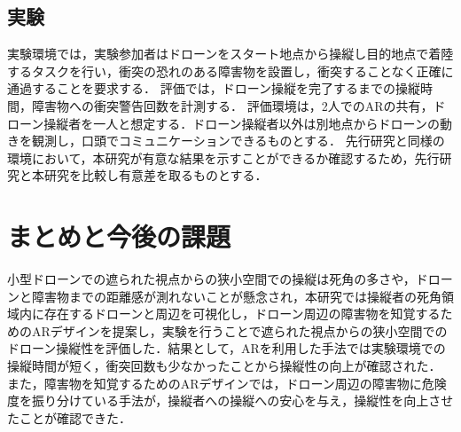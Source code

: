\documentclass[a4paper,10pt,twocolumn,uplatex]{jsarticle}
\begin{document}
\subsection{実験}
実験環境では，実験参加者はドローンをスタート地点から操縦し目的地点で着陸するタスクを行い，衝突の恐れのある障害物を設置し，衝突することなく正確に通過することを要求する．
評価では，ドローン操縦を完了するまでの操縦時間，障害物への衝突警告回数を計測する．
評価環境は，2人でのARの共有，ドローン操縦者を一人と想定する．ドローン操縦者以外は別地点からドローンの動きを観測し，口頭でコミュニケーションできるものとする．
先行研究と同様の環境において，本研究が有意な結果を示すことができるか確認するため，先行研究と本研究を比較し有意差を取るものとする．


\section{まとめと今後の課題}
小型ドローンでの遮られた視点からの狭小空間での操縦は死角の多さや，ドローンと障害物までの距離感が測れないことが懸念され，本研究では操縦者の死角領域内に存在するドローンと周辺を可視化し，ドローン周辺の障害物を知覚するためのARデザインを提案し，実験を行うことで遮られた視点からの狭小空間でのドローン操縦性を評価した．結果として，ARを利用した手法では実験環境での操縦時間が短く，衝突回数も少なかったことから操縦性の向上が確認された．
また，障害物を知覚するためのARデザインでは，ドローン周辺の障害物に危険度を振り分けている手法が，操縦者への操縦への安心を与え，操縦性を向上させたことが確認できた．




\end{document}
